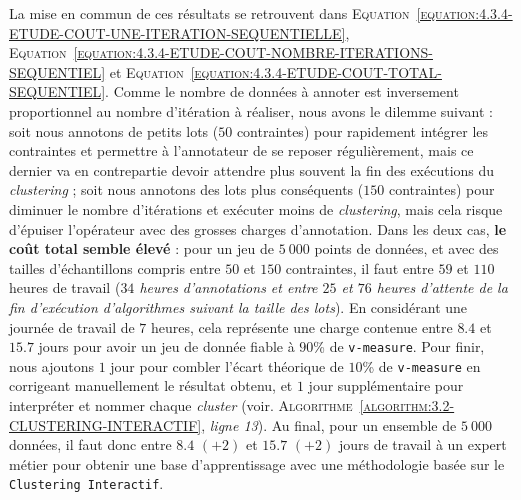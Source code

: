 			La mise en commun de ces résultats se retrouvent dans \textsc{Equation~\ref{equation:4.3.4-ETUDE-COUT-UNE-ITERATION-SEQUENTIELLE}}, \textsc{Equation~\ref{equation:4.3.4-ETUDE-COUT-NOMBRE-ITERATIONS-SEQUENTIEL}} et \textsc{Equation~\ref{equation:4.3.4-ETUDE-COUT-TOTAL-SEQUENTIEL}}.
			Comme le nombre de données à annoter est inversement proportionnel au nombre d'itération à réaliser, nous avons le dilemme suivant : soit nous annotons de petits lots ($50$ contraintes) pour rapidement intégrer les contraintes et permettre à l'annotateur de se reposer régulièrement, mais ce dernier va en contrepartie devoir attendre plus souvent la fin des exécutions du \textit{clustering} ; soit nous annotons des lots plus conséquents ($150$ contraintes) pour diminuer le nombre d'itérations et exécuter moins de \textit{clustering}, mais cela risque d'épuiser l'opérateur avec des grosses charges d'annotation.
			Dans les deux cas, \textbf{le coût total semble élevé} : pour un jeu de $5~000$ points de données, et avec des tailles d'échantillons compris entre $50$ et $150$ contraintes, il faut entre $59$ et $110$ heures de travail (\textit{$34$ heures d'annotations et entre $25$ et $76$ heures d'attente de la fin d'exécution d'algorithmes suivant la taille des lots}).
			En considérant une journée de travail de $7$ heures, cela représente une charge contenue entre $8.4$ et $15.7$ jours pour avoir un jeu de donnée fiable à $90$\% de \texttt{v-measure}.
			Pour finir, nous ajoutons $1$ jour pour combler l'écart théorique de $10$\% de \texttt{v-measure} en corrigeant manuellement le résultat obtenu, et $1$ jour supplémentaire pour interpréter et nommer chaque \textit{cluster} (voir. \textsc{Algorithme~\ref{algorithm:3.2-CLUSTERING-INTERACTIF}}, \textit{ligne 13}).
			Au final, pour un ensemble de $5~000$ données, il faut donc entre $8.4$ {\footnotesize $(+2)$} et $15.7$ {\footnotesize $(+2)$} jours de travail à un expert métier pour obtenir une base d'apprentissage avec une méthodologie basée sur le \texttt{Clustering Interactif}.
			
